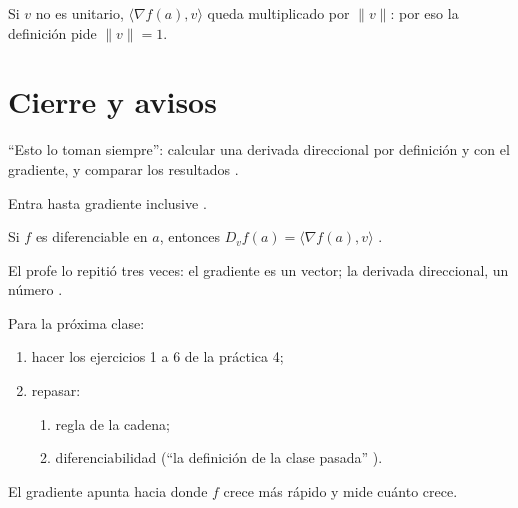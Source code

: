 \documentclass{classmer}
\begin{document}
\begin{agregadoIA}
Si $v$ no es unitario, $\langle\nabla f(a),v\rangle$ queda multiplicado por
$\|v\|$: por eso la definición pide $\|v\|=1$.
\end{agregadoIA}

\section{Cierre y avisos }

\begin{parcial}
``Esto lo toman siempre'': calcular una derivada direccional por definición y
con el gradiente, y comparar los resultados .
\end{parcial}

\begin{parcial}[clase]
Entra hasta gradiente inclusive .
\end{parcial}

\begin{importante}[clase]
Si $f$ es diferenciable en $a$, entonces $D_vf(a)=\langle\nabla f(a),v\rangle$
.
\end{importante}

\begin{importante}
El profe lo repitió tres veces: el gradiente es un vector; la derivada
direccional, un número .
\end{importante}

Para la próxima clase:
\begin{enumerate}
  \item hacer los ejercicios 1 a 6 de la práctica 4;
  \item repasar:
  \begin{enumerate}
    \item regla de la cadena;
    \item diferenciabilidad (``la definición de la clase pasada'' ).
  \end{enumerate}
\end{enumerate}

\begin{intuicion}
El gradiente apunta hacia donde $f$ crece más rápido y mide cuánto crece.
\end{intuicion}
\end{document}
